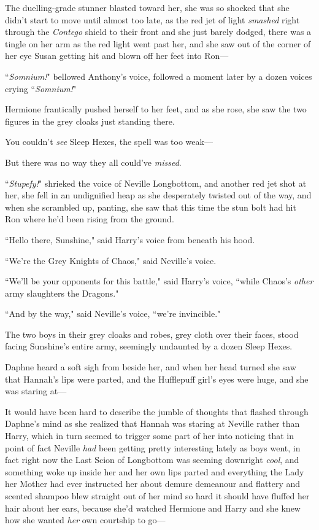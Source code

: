The duelling-grade stunner blasted toward her, she was so shocked that she didn't start to move until almost too late, as the red jet of light \emph{smashed} right through the \emph{Contego} shield to their front and she just barely dodged, there was a tingle on her arm as the red light went past her, and she saw out of the corner of her eye Susan getting hit and blown off her feet into Ron—

``\emph{Somnium!}" bellowed Anthony's voice, followed a moment later by a dozen voices crying ``\emph{Somnium!}"

Hermione frantically pushed herself to her feet, and as she rose, she saw the two figures in the grey cloaks just standing there.

You couldn't \emph{see} Sleep Hexes, the spell was too weak—

But there was no way they all could've \emph{missed}.

``\emph{Stupefy!}" shrieked the voice of Neville Longbottom, and another red jet shot at her, she fell in an undignified heap as she desperately twisted out of the way, and when she scrambled up, panting, she saw that this time the stun bolt had hit Ron where he'd been rising from the ground.

``Hello there, Sunshine," said Harry's voice from beneath his hood.

``We're the Grey Knights of Chaos," said Neville's voice.

``We'll be your opponents for this battle," said Harry's voice, ``while Chaos's \emph{other} army slaughters the Dragons."

``And by the way," said Neville's voice, ``we're invincible."

\later

The two boys in their grey cloaks and robes, grey cloth over their faces, stood facing Sunshine's entire army, seemingly undaunted by a dozen Sleep Hexes.

Daphne heard a soft sigh from beside her, and when her head turned she saw that Hannah's lips were parted, and the Hufflepuff girl's eyes were huge, and she was staring at—

It would have been hard to describe the jumble of thoughts that flashed through Daphne's mind as she realized that Hannah was staring at Neville rather than Harry, which in turn seemed to trigger some part of her into noticing that in point of fact Neville \emph{had} been getting pretty interesting lately as boys went, in fact right now the Last Scion of Longbottom was seeming downright \emph{cool}, and something woke up inside her and her own lips parted and everything the Lady her Mother had ever instructed her about demure demeanour and flattery and scented shampoo blew straight out of her mind so hard it should have fluffed her hair about her ears, because she'd watched Hermione and Harry and she knew how she wanted \emph{her} own courtship to go—

